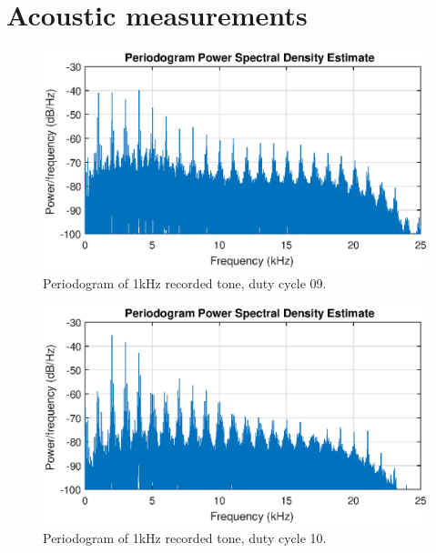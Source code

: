 \chapter{Acoustic measurements}
\label{sec:appdx:akustisk}
\newpage
\begin{figure}[H]
    \centering
    \includegraphics[trim={0cm 1.6cm 0cm 2cm},clip,width=\textwidth]{img/Periodogram_1khz-09.eps}
    \caption{Periodogram of 1kHz recorded tone, duty cycle 09.}
    \label{fig:appdx:period_1k-09}
\end{figure}
\begin{figure}[H]
    \centering
    \includegraphics[trim={0cm 1.6cm 0cm 2cm},clip,width=\textwidth]{img/akustisk/Periodogram_1kHz-10.eps}
    \caption{Periodogram of 1kHz recorded tone, duty cycle 10.}
    \label{fig:appdx:period_1k-10}
\end{figure}


